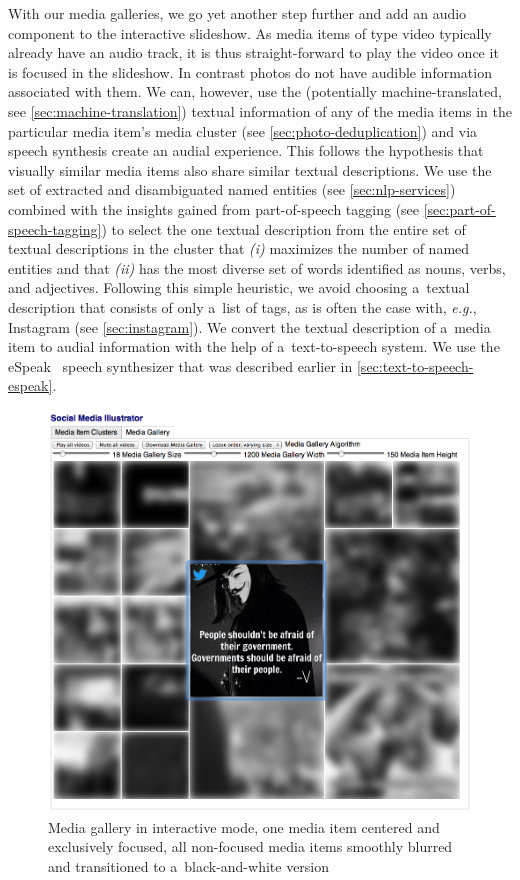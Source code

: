 With our media galleries, we go yet another step further
and add an audio component to the interactive slideshow.
As media items of type video typically already have an audio track,
it is thus straight-forward to play the video once it is focused
in the slideshow.
In contrast photos do not have audible information associated with them.
We can, however, use the (potentially machine-translated,
see \autoref{sec:machine-translation}) textual information
of any of the media items in the particular media item's media cluster
(see \autoref{sec:photo-deduplication})
and via speech synthesis create an audial experience.
This follows the hypothesis that visually similar media items 
also share similar textual descriptions.
We use the set of extracted and disambiguated named entities
(see \autoref{sec:nlp-services}) combined with
the insights gained from part-of-speech tagging
(see \autoref{sec:part-of-speech-tagging})
to select the one textual description
from the entire set of textual descriptions in the cluster
that \textit{(i)} maximizes the number of named entities
and that \textit{(ii)} has the most diverse set of words
identified as nouns, verbs, and adjectives.
Following this simple heuristic, we avoid choosing
a~textual description that consists of only a~list of tags,
as is often the case with, \emph{e.g.},
Instagram (see \autoref{sec:instagram}).
We convert the textual description of a~media item
to audial information with the help of a~text-to-speech system.
We use the eSpeak~\cite{duddington2012espeak} speech synthesizer
that was described earlier in \autoref{sec:text-to-speech-espeak}.

\begin{figure}[!ht]
  \centering
  \includegraphics[width=1\columnwidth]{occupygezi1.png}
  \caption[Media gallery in interactive mode]{Media gallery in interactive mode, one media item centered and exclusively focused, all non-focused media items smoothly blurred and transitioned to a~black-and-white version}
  \label{fig:occupygezi1}
\end{figure}

